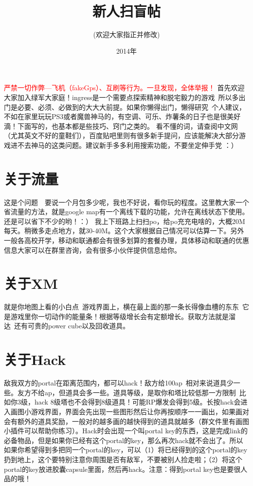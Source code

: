 \documentclass[12pt]{article}
\theoremstyle{definition}
\theoremstyle{remark}
\numberwithin{equation}{section}
\begin{document}
\title{新人扫盲帖}
\author{(欢迎大家指正并修改)}
\date{2014年}

\maketitle
\huge\textcolor{red}{严禁一切作弊---飞机（fakeGps）、互刷等行为。一旦发现，全体举报！}
\normalsize
\newpage
首先欢迎大家加入绿军大家庭！ingress是一个需要点探索精神和脱宅毅力的游戏~所以多出门是必要、必须、必做到的大大大前提。如果你懒得出门，懒得研究~个人建议，不如在家里玩玩PS3或者魔兽神马的，有空调、可乐、炸薯条的日子也是很美好滴！下面写的，也基本都是些技巧、窍门之类的。 看不懂的词，请查阅中文网（尤其英文不好的童鞋们），百度贴吧里则有很多新手提问，应该能解决大部分游戏进不去神马的这类问题。建议新手多多利用搜索功能，不要坐定伸手党 ：）

\section{关于流量}
这是个问题~~要说一个月包多少呢，我也不好说，看你玩的程度。这里教大家一个省流量的方法，就是google map有一个离线下载的功能，允许在离线状态下使用。还是可以省下不少的哟！：） 我上下班路上扫扫po，给po充充电啥的，大概20M每天。稍微多走点地方，就30-40M。这个大家根据自己情况可以估算一下。另外一般各高校开学，移动和联通都会有很多划算的套餐办理，具体移动和联通的优惠信息大家可以在群里咨询，会有很多小伙伴提供信息给你。

\section{关于XM}
就是你地图上看的小白点~游戏界面上，横在最上面的那一条长得像血槽的东东~它是游戏里你一切动作的能量条！根据等级增长会有定额增长。获取方法就是溜达~还有可贵的power cube以及回收道具。

\section{关于Hack}
敌我双方的portal在距离范围内，都可以hack！敌方给100ap~相对来说道具少一些。友方不给ap，但道具会多一些。道具等级，是取你和塔比较低那一方限制~比如你3级，hack 8级塔也不会得到8级道具！可能RP爆发会得到5级。长按hack会进入画图小游戏界面，界面会先出现一些图形然后让你再按顺序一一画出，如果画对会有额外的道具奖励，一般对的越多画的越快得到的道具就越多（群文件里有画图小插件可以帮助你练习）。Hack时会出现一个叫portal key的东西，这是完成link的必备物品，但是如果你已经有这个portal的key，那么再次hack就不会出了。所以如果你希望得到多把同一个portal的key，可以（1）将已经得到的这个portal的key扔到地上，这个要特别注意你周围是否有敌军，不要被别人捡走啦；（2）将这个portal的key放进胶囊capsule里面，然后再hack。注意：得到portal key也是要很人品的哦！
\end{document}
